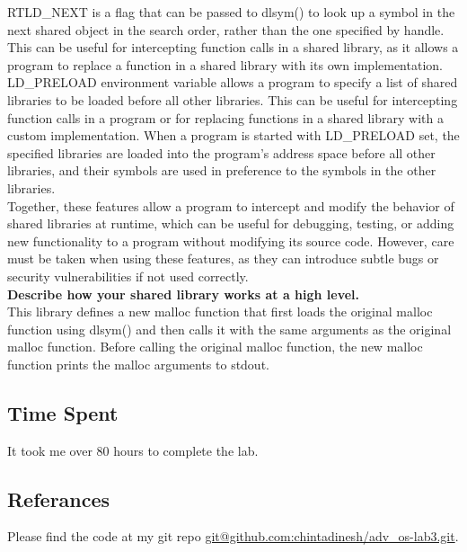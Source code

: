 \documentclass{article}
\begin{document}
RTLD\_NEXT is a flag that can be passed to dlsym() to look up a symbol in the next shared object in the search order, 
rather than the one specified by handle. 
This can be useful for intercepting function calls in a shared library, as it allows a program to 
replace a function in a shared library with its own implementation.\\

LD\_PRELOAD environment variable allows a program to specify a list of shared libraries to 
be loaded before all other libraries. 
This can be useful for intercepting function calls in a program or for replacing functions in a shared 
library with a custom implementation. 
When a program is started with LD\_PRELOAD set, the specified libraries are loaded into the program's 
address space before all other libraries, and their symbols are used in preference to the symbols in 
the other libraries.\\

Together, these features allow a program to intercept and modify the behavior of shared libraries at 
runtime, which can be useful for debugging, testing, or adding new functionality to a program without 
modifying its source code.
However, care must be taken when using these features, as they can introduce subtle bugs or security 
vulnerabilities if not used correctly.\\

\textbf{Describe how your shared library works at a high level.}\\

This library defines a new malloc function that first loads the original malloc function using dlsym() 
and then calls it with the same arguments as the original malloc function. 
Before calling the original malloc function, the new malloc function prints the malloc arguments to 
stdout.

\subsection{Time Spent}

It took me over 80 hours to complete the lab.

\subsection{Referances}
Please find the code at my git repo \href{git@github.com:chintadinesh/adv\_os-lab3.git}{git@github.com:chintadinesh/adv\_os-lab3.git}.
\end{document}

